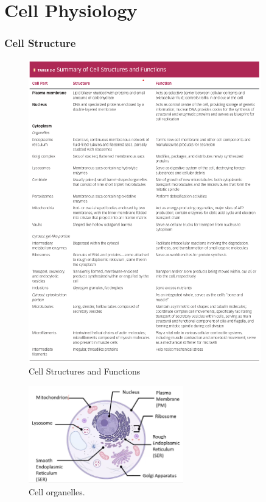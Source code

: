 \documentclass[10pt]{article}
\begin{document}
\part{Cell Physiology}

\section{Cell Structure}
\begin{figure}[h]
    \centering
    \includegraphics[width=0.9\textwidth]{cellStructuresAndFunctions}
    \caption{Cell Structures and Functions}
    \label{fig:Cell Structures and Functions}
\end{figure}
\begin{figure}[h]
    \centering
    \includegraphics[width=0.6\textwidth]{cellOrganelles}
    \caption{Cell organelles.}
    \label{fig:cellOrganelles}
\end{figure}
\end{document}
